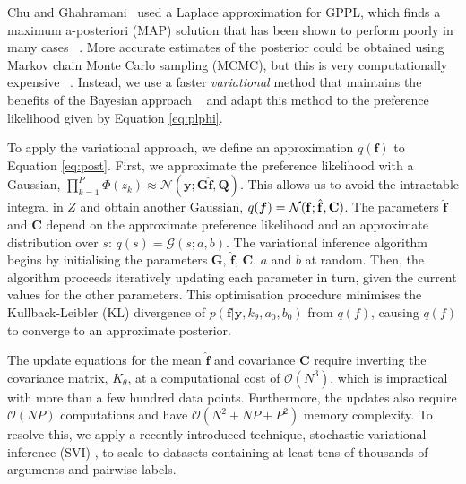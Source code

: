 Chu and Ghahramani~
used a Laplace approximation for GPPL, which finds a maximum a-posteriori (MAP) solution
that has been shown to perform poorly in many cases
~\cite{nickisch2008approximations}. 
More accurate estimates of the posterior could be obtained using Markov chain Monte Carlo sampling (MCMC),
but this is very computationally expensive ~\cite{nickisch2008approximations}. 
Instead, we use a faster \emph{variational} method that maintains the benefits of the Bayesian approach
~\cite{reece2011determining,steinberg2014extended} and adapt this method 
to the preference likelihood given by Equation \ref{eq:plphi}.

To apply the variational approach, we define an approximation $q(\mathbf f)$ to Equation \ref{eq:post}. 
First, we approximate the preference likelihood with a Gaussian, $\prod_{k=1}^P \Phi\left( z_k \right) \approx \mathcal{N}(\mathbf y; \mathbf G\hat{\mathbf f}, \mathbf Q)$. This allows us to avoid the intractable integral in $Z$ and obtain another Gaussian, $q(\boldsymbol f) = \mathcal{N}(\mathbf f; \hat{\mathbf f}, \mathbf C)$. 
The parameters $\hat{\mathbf f}$ and $\mathbf C$ 
depend on the approximate preference likelihood 
and an approximate distribution over $s$: $q(s) = \mathcal{G}(s; a, b)$. 
The variational inference algorithm begins by initialising the parameters $\mathbf G$, $ \hat{\mathbf f}$, $\mathbf C$, $a$ and $b$ at random. Then, the  algorithm proceeds iteratively updating each parameter in turn, given the current values for the other parameters. 
This optimisation procedure minimises the Kullback-Leibler (KL) divergence of $p(\mathbf f |\mathbf y, k_{\theta}, a_0, b_0)$ from $q(f)$, causing $q(f)$ to converge to an approximate posterior. 

The update equations for the mean $\hat{\mathbf f}$ and covariance $\mathbf C$ require inverting the covariance matrix, $K_{\theta}$, at a computational cost of $\mathcal{O}(N^3)$, which is impractical with more than a few hundred data points. 
Furthermore, the updates also require $\mathcal{O}(NP)$ computations and
have $\mathcal{O}(N^2 + NP + P^2)$ memory complexity.
To resolve this, 
we apply a recently introduced technique, stochastic variational inference (SVI) 
\cite{hoffman2013stochastic,hensman_scalable_2015},
to scale to datasets containing at least tens of thousands of arguments and pairwise labels.

